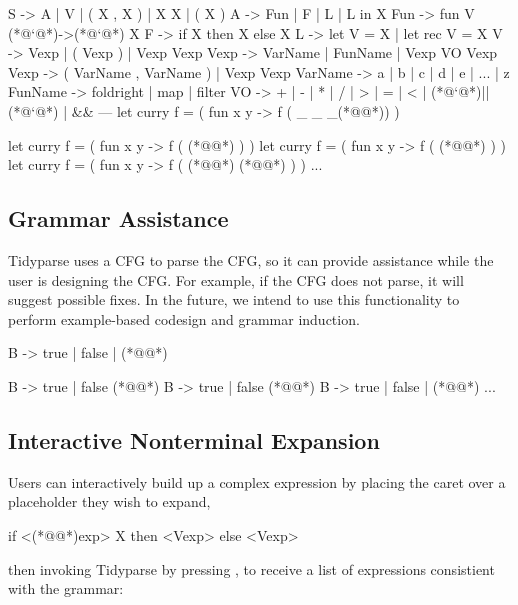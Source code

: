 \documentclass[sigplan,review,anonymous,acmsmall]{acmart}\settopmatter{printfolios=false,printccs=false,printacmref=false}
\begin{document}
\begin{tidyinput}
S -> A | V | ( X , X ) | X X | ( X )
A -> Fun | F | L | L in X
Fun -> fun V (*@`@*)->(*@`@*) X
F -> if X then X else X
L -> let V = X | let rec V = X
V -> Vexp | ( Vexp ) | Vexp Vexp
Vexp -> VarName | FunName | Vexp VO Vexp
Vexp -> ( VarName , VarName ) | Vexp Vexp
VarName -> a | b | c | d | e | ... | z
FunName -> foldright | map | filter
VO ->  + | - | * | / | > | = | < | (*@`@*)||(*@`@*) | &&
---
let curry f = ( fun x y -> f ( _ _ _(*@\caret{ }@*)) )
\end{tidyinput}
\begin{tidyoutput}
let curry f = ( fun x y -> f ( (*@@*) ) )
let curry f = ( fun x y -> f ( (*@@*) ) )
let curry f = ( fun x y -> f ( (*@@*) (*@@*) ) )
...
\end{tidyoutput}

    \subsection{Grammar Assistance}

    Tidyparse uses a CFG to parse the CFG, so it can provide assistance while the user is designing the CFG. For example, if the CFG does not parse, it will suggest possible fixes. In the future, we intend to use this functionality to perform example-based codesign and grammar induction.

\begin{tidyinput}
B -> true | false | (*@\caret{ }@*)
\end{tidyinput}
\begin{tidyoutput}
B -> true | false (*@\hlred{ }@*)
B -> true | false (*@@*)
B -> true | false | (*@@*)
...
\end{tidyoutput}

    \subsection{Interactive Nonterminal Expansion}

    Users can interactively build up a complex expression by placing the caret over a placeholder they wish to expand,

\begin{tidyinput}
if <(*@@*)exp> X then <Vexp> else <Vexp>
\end{tidyinput}

    \noindent then invoking Tidyparse by pressing \keys{\ctrl + \SPACE}, to receive a list of expressions consistient with the grammar:
\end{document}
